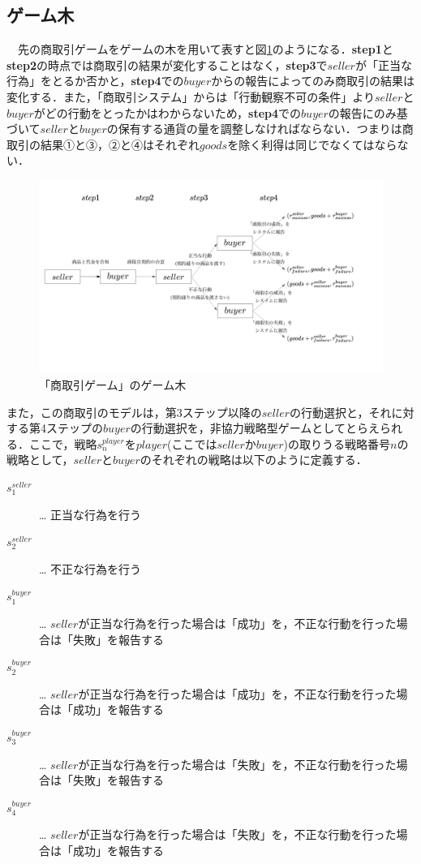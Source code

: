 \documentclass[twocolumn, a4j]{article}
\begin{document}
\subsection{ゲーム木}
　先の商取引ゲームをゲームの木を用いて表すと図\ref{gametree}のようになる．\textbf{step1}と\textbf{step2}の時点では商取引の結果が変化することはなく，\textbf{step3}で$seller$が「正当な行為」をとるか否かと，\textbf{step4}での$buyer$からの報告によってのみ商取引の結果は変化する．また，「商取引システム」からは「行動観察不可の条件」より$seller$と$buyer$がどの行動をとったかはわからないため，\textbf{step4}での$buyer$の報告にのみ基づいて$seller$と$buyer$の保有する通貨の量を調整しなければならない．つまりは商取引の結果①と③，②と④はそれぞれ$goods$を除く利得は同じでなくてはならない．

\begin{figure}[b]
  \centering
  \includegraphics[width=1\linewidth]{gametree.png}
  \caption{「商取引ゲーム」のゲーム木}
  \label{gametree}
\end{figure}

また，この商取引のモデルは，第3ステップ以降の$seller$の行動選択と，それに対する第4ステップの$ buyer$の行動選択を，非協力戦略型ゲームとしてとらえられる．ここで，戦略$ s^{player}_{n}$を$ player$(ここでは$seller$か$buyer$)の取りうる戦略番号$n$の戦略として，$seller$と$buyer$のそれぞれの戦略は以下のように定義する．\\

\begin{description}
  \item[$s^{seller}_1$]… 正当な行為を行う
  \item[$s^{seller}_2$]… 不正な行為を行う
  \item[$s^{buyer}_1$]… $ seller$が正当な行為を行った場合は「成功」を，不正な行動を行った場合は「失敗」を報告する
  \item[$s^{buyer}_2$]… $ seller$が正当な行為を行った場合は「成功」を，不正な行動を行った場合は「成功」を報告する
  \item[$s^{buyer}_3$]… $ seller$が正当な行為を行った場合は「失敗」を，不正な行動を行った場合は「失敗」を報告する
  \item[$s^{buyer}_4$]… $ seller$が正当な行為を行った場合は「失敗」を，不正な行動を行った場合は「成功」を報告する
\end{description}
\end{document}
